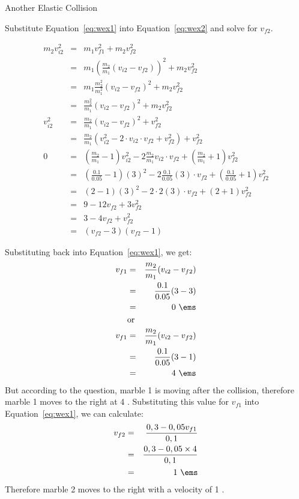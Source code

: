 \begin{wex}{Another Elastic Collision}
{Substitute Equation~\ref{eq:wex1} into Equation~\ref{eq:wex2} and solve for $v_{f2}$.

\begin{eqnarray*}
m_{2}{v}_{i2}^2 &=& m_{1}{v}_{f1}^2+m_{2}{v}_{f2}^2\\
&=& m_{1} \left( \frac{m_2}{m_1}({v}_{i2} - {v}_{f2}) \right) ^2 +m_{2}{v}_{f2}^2\\
&=& m_{1} \frac{m_2^2}{m_1^2}\left({v}_{i2} - {v}_{f2} \right) ^2 +m_{2}{v}_{f2}^2\\
&=& \frac{m_2^2}{m_1}\left({v}_{i2} - {v}_{f2} \right) ^2 +m_{2}{v}_{f2}^2\\
{v}_{i2}^2&=& \frac{m_2}{m_1}\left({v}_{i2} - {v}_{f2} \right) ^2 +{v}_{f2}^2\\
&=&\frac{m_2}{m_1}\left({v}_{i2}^2 - 2\cdot v_{i2}\cdot v_{f2} + {v}_{f2}^2 \right) +{v}_{f2}^2\\
0&=&\left(\frac{m_2}{m_1}-1 \right){v}_{i2}^2 - 2 \frac{m_2}{m_1} v_{i2}\cdot v_{f2} + \left(\frac{m_2}{m_1}+1\right){v}_{f2}^2\\
&=&\left(\frac{0.1}{0.05}-1 \right)(3)^2 - 2 \frac{0.1}{0.05} (3)\cdot v_{f2} + \left(\frac{0.1}{0.05}+1\right){v}_{f2}^2\\
&=&(2-1)(3)^2 - 2 \cdot 2 (3)\cdot v_{f2} + (2+1){v}_{f2}^2\\
&=&9 - 12v_{f2} + 3{v}_{f2}^2\\
&=&3 - 4v_{f2} + {v}_{f2}^2\\
&=&(v_{f2}-3)(v_{f2}-1)
\end{eqnarray*}

Substituting back into Equation~\ref{eq:wex1}, we get:
\begin{eqnarray*}
{v}_{f1} &=& \frac{m_2}{m_1}({v}_{i2} - {v}_{f2})\\
&=& \frac{0.1}{0.05}(3 - 3)\\
&=&0\ \ems\\
&\mbox{or}&\\
{v}_{f1} &=& \frac{m_2}{m_1}({v}_{i2} - {v}_{f2})\\
&=& \frac{0.1}{0.05}(3 - 1)\\
&=&4\ \ems
\end{eqnarray*}
But according to the question, marble 1 is moving after the collision, therefore marble 1 moves to the right at 4 \ms.
Substituting this value for ${v}_{f1} $ into Equation~\ref{eq:wex1}, we can calculate:
\begin{eqnarray*}
v_{f2} & = &  \frac{0,3 - 0,05v_{f1}}{0,1} \\
& = & \frac{0,3 - 0,05\times4}{0,1} \\
& = & 1\ \ems
\end{eqnarray*}
Therefore marble 2 moves to the right with a velocity of 1 \ms.
 
 }
\end{wex}

